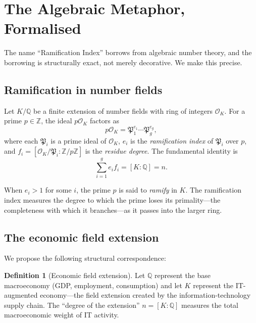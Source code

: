 \documentclass[12pt]{article}
\theoremstyle{definition}
\newtheorem{definition}[theorem]{Definition}
\newcommand{\Z}{\mathbb{Z}}
\newcommand{\Q}{\mathbb{Q}}
\newcommand{\cO}{\mathcal{O}}
\begin{document}
\section{The Algebraic Metaphor, Formalised}
\label{sec:algebraic}

The name ``Ramification Index'' borrows from algebraic number theory, and the borrowing is structurally exact, not merely decorative. We make this precise.

\subsection{Ramification in number fields}

Let $K/\Q$ be a finite extension of number fields with ring of integers $\cO_K$. For a prime $p \in \Z$, the ideal $p\cO_K$ factors as
\begin{equation}
\label{eq:ramification}
p\cO_K = \mathfrak{P}_1^{e_1} \cdots \mathfrak{P}_g^{e_g},
\end{equation}
where each $\mathfrak{P}_i$ is a prime ideal of $\cO_K$, $e_i$ is the \emph{ramification index} of $\mathfrak{P}_i$ over $p$, and $f_i = [\cO_K/\mathfrak{P}_i : \Z/p\Z]$ is the \emph{residue degree}. The fundamental identity is
\begin{equation}
\label{eq:fundamental}
\sum_{i=1}^{g} e_i f_i = [K:\Q] = n.
\end{equation}

When $e_i > 1$ for some $i$, the prime $p$ is said to \emph{ramify} in $K$. The ramification index measures the degree to which the prime loses its primality---the completeness with which it branches---as it passes into the larger ring.

\subsection{The economic field extension}

We propose the following structural correspondence:

\begin{definition}[Economic field extension]
\label{def:economic_field}
Let $\Q$ represent the base macroeconomy (GDP, employment, consumption) and let $K$ represent the IT-augmented economy---the field extension created by the information-technology supply chain. The ``degree of the extension'' $n = [K:\Q]$ measures the total macroeconomic weight of IT activity.
\end{definition}
\end{document}
